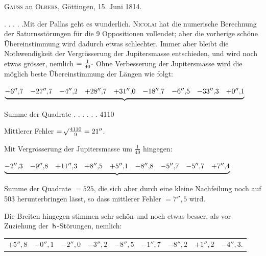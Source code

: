 \par{}\bigskip
\begin{center}
\textsc{Gauss} an \textsc{Olbers}, Göttingen, 15. Juni 1814.
\end{center}
\noindent\hspace*{\parindent}. . . . .\quad Mit der Pallas geht es wunderlich. \textsc{Nicolai} hat die numerische Berechnung der Saturnsstörungen für die 9 Oppositionen vollendet; aber die vorherige schöne Übereinstimmung wird dadurch etwas schlechter. Immer aber bleibt die Nothwendigkeit der Vergrösserung der Jupitersmasse entschieden, und wird noch etwas grösser, nemlich \(=\frac{1}{40}\mathpunct{\raisebox{.3ex}{.}}\) Ohne Verbesserung der Jupitersmasse wird die möglich beste Übereinstimmung der Längen wie folgt:
\begin{center}
\begingroup\small\setlength{\arraycolsep}{3pt}
\(\underbrace{\begin{array}{@{}rrrrrrrrr@{}}
-6''{,}7&-27''{,}7&-4''{,}2&+28''{,}7&+31''{,}0&-18''{,}7&-6''{,}5&-33''{,}3&+0''{,}1
\end{array}}\)\par
Summe der Quadrate . . . . . . 4110\par\smallskip
Mittlerer Fehler \(=\mathord{{}^{}\!\surd}\frac{4110}{9}=21''\).
\endgroup
\end{center}
\par Mit Vergrösserung der Jupitersmasse um \(\frac{1}{40}\) hingegen:
\begin{center}
\begingroup\small\setlength{\arraycolsep}{3pt}
\(\underbrace{\begin{array}{@{}rrrrrrrrr@{}}
-2''{,}3&-9''{,}8&+11''{,}3&+8''{,}5&+5''{,}1&-8''{,}8&-5''{,}7&-5''{,}7&+7''{,}4
\end{array}}\)\par
Summe der Quadrate \(=525\), die sich aber durch eine kleine Nachfeilung noch auf 503 herunterbringen lässt, so dass mittlerer Fehler \(=7''{,}5\) wird.
\endgroup
\end{center}
\par Die Breiten hingegen stimmen sehr schön und noch etwas besser, als vor Zuziehung der {\AstroSymbols ♄}-Störungen, nemlich:
\begin{center}
\begingroup\small\setlength{\tabcolsep}{3pt}
\begin{tabular}{@{}rrrrrrrrr@{}}
\(+5''{,}8\)&\(-0''{,}1\)&\(-2''{,}0\)&\(-3''{,}2\)&\(-8''{,}5\)\footnotemark&\(-1''{,}7\)&\(-8''{,}2\)&\(+1''{,}2\)&\(-4''{,}3\).
\end{tabular}
\endgroup
\end{center}
